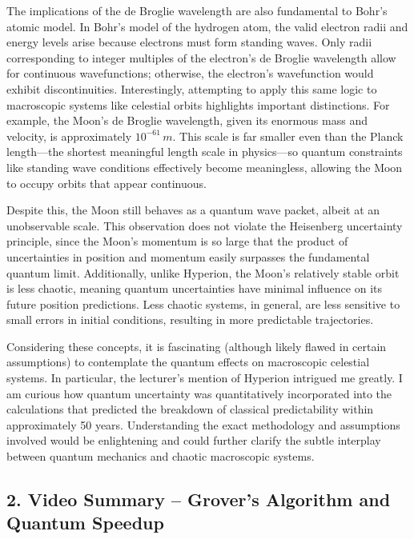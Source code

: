 \documentclass{article}
\theoremstyle{theorem}
\theoremstyle{definition}
\theoremstyle{remark}
\begin{document}
The implications of the de Broglie wavelength are also fundamental to Bohr’s atomic model. In Bohr’s model of the hydrogen atom, the valid electron radii and energy levels arise because electrons must form standing waves. Only radii corresponding to integer multiples of the electron’s de Broglie wavelength allow for continuous wavefunctions; otherwise, the electron’s wavefunction would exhibit discontinuities. Interestingly, attempting to apply this same logic to macroscopic systems like celestial orbits highlights important distinctions. For example, the Moon's de Broglie wavelength, given its enormous mass and velocity, is approximately \(10^{-61}\,m\). This scale is far smaller even than the Planck length—the shortest meaningful length scale in physics—so quantum constraints like standing wave conditions effectively become meaningless, allowing the Moon to occupy orbits that appear continuous.

Despite this, the Moon still behaves as a quantum wave packet, albeit at an unobservable scale. This observation does not violate the Heisenberg uncertainty principle, since the Moon’s momentum is so large that the product of uncertainties in position and momentum easily surpasses the fundamental quantum limit. Additionally, unlike Hyperion, the Moon's relatively stable orbit is less chaotic, meaning quantum uncertainties have minimal influence on its future position predictions. Less chaotic systems, in general, are less sensitive to small errors in initial conditions, resulting in more predictable trajectories.

Considering these concepts, it is fascinating (although likely flawed in certain assumptions) to contemplate the quantum effects on macroscopic celestial systems. In particular, the lecturer's mention of Hyperion intrigued me greatly. I am curious how quantum uncertainty was quantitatively incorporated into the calculations that predicted the breakdown of classical predictability within approximately 50 years. Understanding the exact methodology and assumptions involved would be enlightening and could further clarify the subtle interplay between quantum mechanics and chaotic macroscopic systems.

\subsection*{2. Video Summary – Grover's Algorithm and Quantum Speedup}
\end{document}
